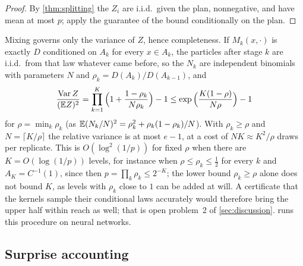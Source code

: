 \begin{proof}
By \cref{thm:splitting} the $Z_i$ are i.i.d.\ given the plan, nonnegative, and have
mean at most $p$; apply the guarantee of the bound conditionally on the plan.
\end{proof}

Mixing governs only the variance of $Z$, hence completeness. If $M_k(x,\cdot)$ is
exactly $D$ conditioned on $A_k$ for every $x\in A_k$, the particles after stage $k$
are i.i.d.\ from that law whatever came before, so the $N_k$ are independent
binomials with parameters $N$ and $\rho_k=D(A_k)/D(A_{k-1})$, and
\[
\frac{\mathrm{Var}\,Z}{(\mathbb{E} Z)^2}=\prod_{k=1}^K\Big(1+\frac{1-\rho_k}{N\rho_k}\Big)-1
\le\exp\Big(\frac{K(1-\rho)}{N\rho}\Big)-1
\]
for $\rho=\min_k\rho_k$ (as $\mathbb{E}(N_k/N)^2=\rho_k^2+\rho_k(1-\rho_k)/N$). With
$\rho_k\ge\rho$ and $N=\lceil K/\rho\rceil$ the relative variance is at most $e-1$,
at a cost of $NK\approx K^2/\rho$ draws per replicate. This is $O(\log^2(1/p))$ for fixed
$\rho$ when there are $K=O(\log(1/p))$ levels, for instance when $\rho\le\rho_k\le\frac12$
for every $k$ and $A_K=C^{-1}(1)$, since then $p=\prod_k\rho_k\le2^{-K}$; the lower bound
$\rho_k\ge\rho$ alone does not bound $K$, as levels with $\rho_k$ close to $1$ can be
added at will. A certificate
that the kernels sample their conditional laws accurately would therefore bring the
upper half within reach as well; that is open problem~2 of \cref{sec:discussion}.
 runs this procedure on neural networks.

\subsection{Surprise accounting}\label{sec:surprise}

